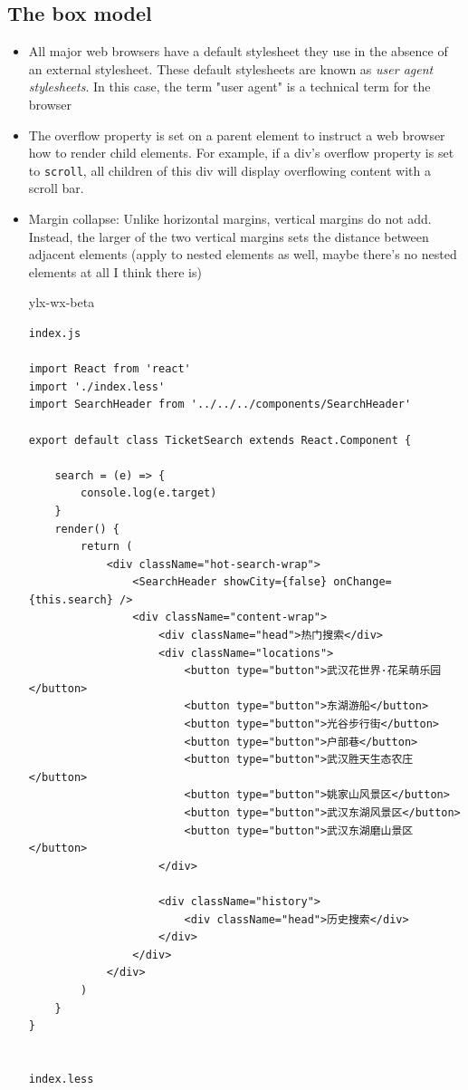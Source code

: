 \documentclass[a4paper, 12pt]{article}
\begin{document}
\subsection{The box model}
\begin{itemize}

\item All major web browsers have a default stylesheet they use in the absence of an external stylesheet. These default stylesheets are known as \textit{user agent stylesheets}. In this case, the term "user agent" is a technical term for the browser

\item The overflow property is set on a parent element to instruct a web browser how to render child elements. For example, if a div's overflow property is set to \verb|scroll|, all children of this div will display overflowing content with a scroll bar.

\item Margin collapse: Unlike horizontal margins, vertical margins do not add. Instead, the larger of the two vertical margins sets the distance between adjacent elements (apply to nested elements as well, maybe there's no nested elements at all {\color{red} I think there is})

ylx-wx-beta
\begin{verbatim}
index.js

import React from 'react'
import './index.less'
import SearchHeader from '../../../components/SearchHeader'

export default class TicketSearch extends React.Component {

	search = (e) => {
		console.log(e.target)
	}
	render() {
		return (
			<div className="hot-search-wrap">
				<SearchHeader showCity={false} onChange={this.search} />
				<div className="content-wrap">
					<div className="head">热门搜索</div>
					<div className="locations">
						<button type="button">武汉花世界·花呆萌乐园</button>
						<button type="button">东湖游船</button>
						<button type="button">光谷步行街</button>
						<button type="button">户部巷</button>
						<button type="button">武汉胜天生态农庄</button>
						<button type="button">姚家山风景区</button>
						<button type="button">武汉东湖风景区</button>
						<button type="button">武汉东湖磨山景区</button>
					</div>

					<div className="history">
						<div className="head">历史搜索</div>
					</div>
				</div>
			</div>
		)
	}
}


index.less


\end{verbatim}
\end{itemize}
\end{document}
